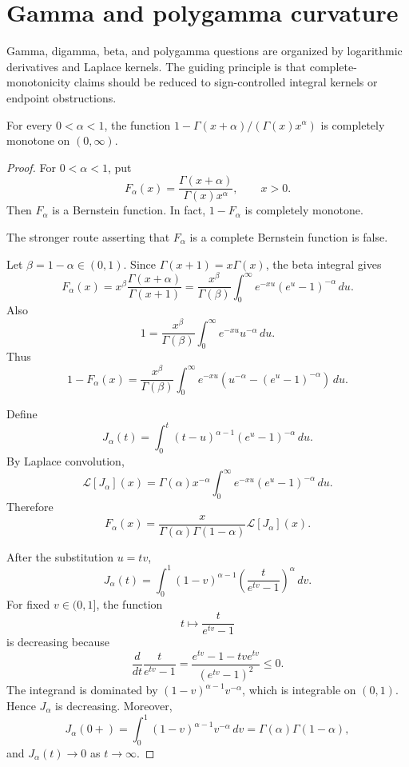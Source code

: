 \section{Gamma and polygamma curvature}
Gamma, digamma, beta, and polygamma questions are organized by logarithmic derivatives and Laplace kernels.  The guiding principle is that complete-monotonicity claims should be reduced to sign-controlled integral kernels or endpoint obstructions.
\begin{theorem}
\label{res:simon-gamma-quotient-complement-cm}
For every \(0<\alpha<1\), the function \(1-\Gamma(x+\alpha)/(\Gamma(x)x^\alpha)\) is completely monotone on \((0,\infty)\).
\end{theorem}
\begin{proof}
For \(0<\alpha<1\), put
\[
F_\alpha(x)=\frac{\Gamma(x+\alpha)}{\Gamma(x)x^\alpha},\qquad x>0.
\]
Then \(F_\alpha\) is a Bernstein function. In fact, \(1-F_\alpha\) is completely monotone.

The stronger route asserting that \(F_\alpha\) is a complete Bernstein function is false.

Let \(\beta=1-\alpha\in(0,1)\). Since \(\Gamma(x+1)=x\Gamma(x)\), the beta integral gives
\[
F_\alpha(x)
=x^\beta\frac{\Gamma(x+\alpha)}{\Gamma(x+1)}
=\frac{x^\beta}{\Gamma(\beta)}
\int_0^\infty e^{-xu}(e^u-1)^{-\alpha}\,du.
\]
Also
\[
1=\frac{x^\beta}{\Gamma(\beta)}
\int_0^\infty e^{-xu}u^{-\alpha}\,du.
\]
Thus
\[
1-F_\alpha(x)
=\frac{x^\beta}{\Gamma(\beta)}
\int_0^\infty e^{-xu}\left(u^{-\alpha}-(e^u-1)^{-\alpha}\right)\,du.
\]

Define
\[
J_\alpha(t)=\int_0^t (t-u)^{\alpha-1}(e^u-1)^{-\alpha}\,du.
\]
By Laplace convolution,
\[
\mathcal L[J_\alpha](x)
=\Gamma(\alpha)x^{-\alpha}
\int_0^\infty e^{-xu}(e^u-1)^{-\alpha}\,du.
\]
Therefore
\[
F_\alpha(x)
=\frac{x}{\Gamma(\alpha)\Gamma(1-\alpha)}\mathcal L[J_\alpha](x).
\]

After the substitution \(u=tv\),
\[
J_\alpha(t)=
\int_0^1
(1-v)^{\alpha-1}
\left(\frac{t}{e^{tv}-1}\right)^\alpha\,dv.
\]
For fixed \(v\in(0,1]\), the function
\[
t\mapsto \frac{t}{e^{tv}-1}
\]
is decreasing because
\[
\frac{d}{dt}\frac{t}{e^{tv}-1}
=
\frac{e^{tv}-1-tv e^{tv}}{(e^{tv}-1)^2}\le0.
\]
The integrand is dominated by \((1-v)^{\alpha-1}v^{-\alpha}\), which is integrable on \((0,1)\). Hence \(J_\alpha\) is decreasing. Moreover,
\[
J_\alpha(0+)
=\int_0^1(1-v)^{\alpha-1}v^{-\alpha}\,dv
=\Gamma(\alpha)\Gamma(1-\alpha),
\]
and \(J_\alpha(t)\to0\) as \(t\to\infty\).


\end{proof}

